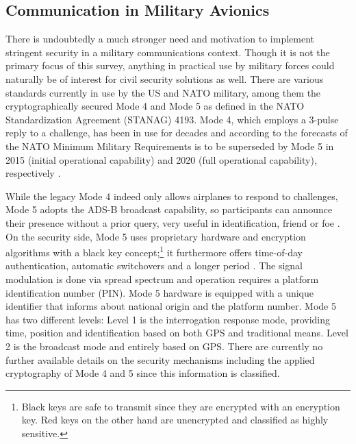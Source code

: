 \documentclass[english]{IEEEtran}
\begin{document}
\subsection{Communication in Military Avionics \label{sub:Communication-in-Military}}

There is undoubtedly a much stronger need and motivation to implement
stringent security in a military communications context. Though it
is not the primary focus of this survey, anything in practical use
by military forces could naturally be of interest for civil security
solutions as well. There are various standards currently in use by
the US and NATO military, among them the cryptographically secured
Mode 4 and Mode 5 as defined in the NATO Standardization Agreement
(STANAG) 4193. Mode 4, which employs a 3-pulse reply to a challenge,
has been in use for decades and according to the forecasts of the
NATO Minimum Military Requirements is to be superseded by Mode 5\emph{
}in 2015 (initial operational capability) and 2020 (full operational
capability), respectively \cite{Wagner2009}\emph{. }

While the legacy Mode 4 indeed only allows airplanes to respond to
challenges, Mode 5 adopts the ADS-B broadcast capability, so participants
can announce their presence without a prior query, very useful in
identification, friend or foe \cite{Assessment1993a}. On the security
side, Mode 5 uses proprietary hardware and encryption algorithms with
a black key concept;\footnote{Black keys are safe to transmit since they are encrypted with an encryption
key.\emph{ }Red keys on the other hand are unencrypted and classified
as highly sensitive.} it furthermore offers time-of-day authentication, automatic switchovers
and a longer period \cite{Kenney2008}. The signal modulation is done
via spread spectrum and operation requires a platform identification
number (PIN). Mode 5 hardware is equipped with a unique identifier
that informs about national origin and the platform number.\emph{
}Mode 5 has two different levels: Level 1 is the interrogation response
mode, providing time, position and identification based on both GPS
and traditional means\emph{.} Level 2 is the broadcast mode and entirely
based on GPS. There are currently no further available details on
the security mechanisms including the applied cryptography of Mode
4 and 5 since this information is classified.
\end{document}
